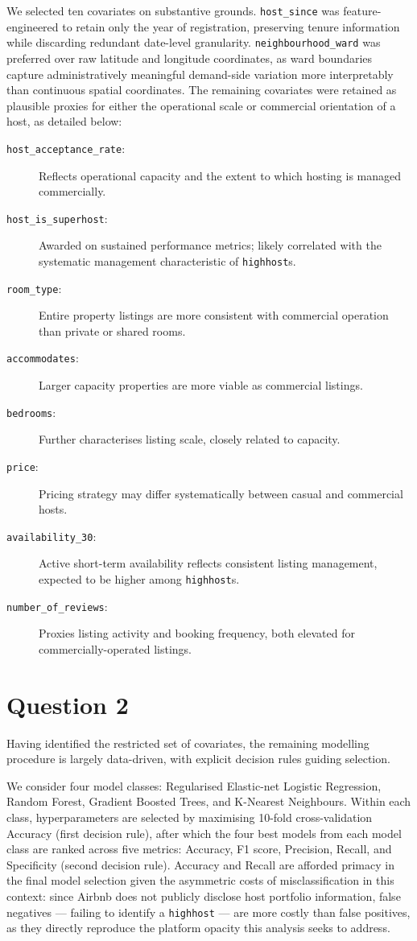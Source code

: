 \documentclass[11pt]{article}\usepackage[]{graphicx}\usepackage[]{xcolor}
\begin{document}
We selected ten covariates on substantive grounds. \texttt{host\_since} was 
feature-engineered to retain only the year of registration, preserving tenure information 
while discarding redundant date-level granularity. \texttt{neighbourhood\_ward} was 
preferred over raw latitude and longitude coordinates, as ward boundaries capture 
administratively meaningful demand-side variation more interpretably than continuous 
spatial coordinates. The remaining covariates were retained as plausible proxies for 
either the operational scale or commercial orientation of a host, as detailed below:

\begin{description}
\item[\texttt{host\_acceptance\_rate}:] Reflects operational capacity and the extent to which hosting is managed commercially.
\item[\texttt{host\_is\_superhost}:] Awarded on sustained performance metrics; likely correlated with the systematic management characteristic of \texttt{highhost}s.
\item[\texttt{room\_type}:] Entire property listings are more consistent with commercial operation than private or shared rooms.
\item[\texttt{accommodates}:] Larger capacity properties are more viable as commercial listings.
\item[\texttt{bedrooms}:] Further characterises listing scale, closely related to capacity.
\item[\texttt{price}:] Pricing strategy may differ systematically between casual and commercial hosts.
\item[\texttt{availability\_30}:] Active short-term availability reflects consistent listing management, expected to be higher among \texttt{highhost}s.
\item[\texttt{number\_of\_reviews}:] Proxies listing activity and booking frequency, both elevated for commercially-operated listings.
\end{description}


\section*{Question 2}
Having identified the restricted set of covariates, the remaining modelling procedure is largely data-driven, with explicit decision rules guiding selection. 

We consider four model classes: Regularised Elastic-net Logistic Regression, Random 
Forest, Gradient Boosted Trees, and K-Nearest Neighbours. Within each class, 
hyperparameters are selected by maximising 10-fold cross-validation Accuracy (first 
decision rule), after which the four best models from each model class are ranked across five metrics: 
Accuracy, F1 score, Precision, Recall, and Specificity (second decision rule). Accuracy 
and Recall are afforded primacy in the final model selection given the asymmetric costs of 
misclassification in this context: since Airbnb does not publicly disclose host portfolio 
information, false negatives — failing to identify a \texttt{highhost} — are more costly 
than false positives, as they directly reproduce the platform opacity this analysis seeks 
to address.
\end{document}
